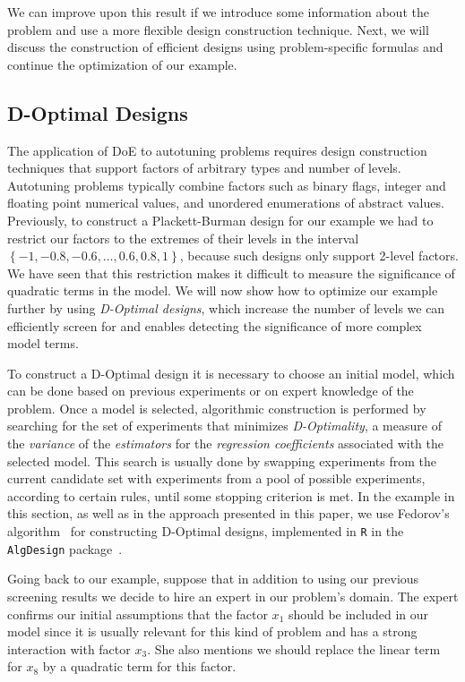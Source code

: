 \documentclass[conference]{IEEEtran}
\begin{document}
We can improve upon this result if we introduce some information about the
problem and use a more flexible design construction technique. Next, we will
discuss the construction of efficient designs using problem-specific formulas
and continue the optimization of our example.
\subsection{D-Optimal Designs}
\label{sec:org6b55bec}
The application of DoE to autotuning problems requires design
construction techniques that support factors of arbitrary types and number of
levels. Autotuning problems typically combine factors such as binary flags,
integer and floating point numerical values, and unordered enumerations of
abstract values. Previously, to construct a Plackett-Burman design for our
example we had to restrict our factors to the extremes of their levels in the
interval \(\left\{-1, -0.8, -0.6,\dots,0.6, 0.8, 1\right\}\), because such designs
only support 2-level factors. We have seen that this restriction makes it
difficult to measure the significance of quadratic terms in the model. We will
now show how to optimize our example further by using \emph{D-Optimal designs}, which
increase the number of levels we can efficiently screen for and enables
detecting the significance of more complex model terms.

To construct a D-Optimal design it is necessary to choose an initial model,
which can be done based on previous experiments or on expert knowledge of the
problem. Once a model is selected, algorithmic construction is performed by
searching for the set of experiments that minimizes \emph{D-Optimality}, a measure of
the \emph{variance} of the \emph{estimators} for the \emph{regression coefficients} associated
with the selected model. This search is usually done by swapping experiments
from the current candidate set with experiments from a pool of possible
experiments, according to certain rules, until some stopping criterion is met.
In the example in this section, as well as in the approach presented in this
paper, we use Fedorov's algorithm~\cite{fedorov1972theory} for
constructing D-Optimal designs, implemented in \texttt{R} in the \texttt{AlgDesign}
package~\cite{wheeler2014algdesign}.

Going back to our example, suppose that in addition to using our previous
screening results we decide to hire an expert in our problem's domain. The
expert confirms our initial assumptions that the factor \(x_1\) should be included
in our model since it is usually relevant for this kind of problem and has a
strong interaction with factor \(x_3\). She also mentions we should replace
the linear term for \(x_8\) by a quadratic term for this factor.
\end{document}
